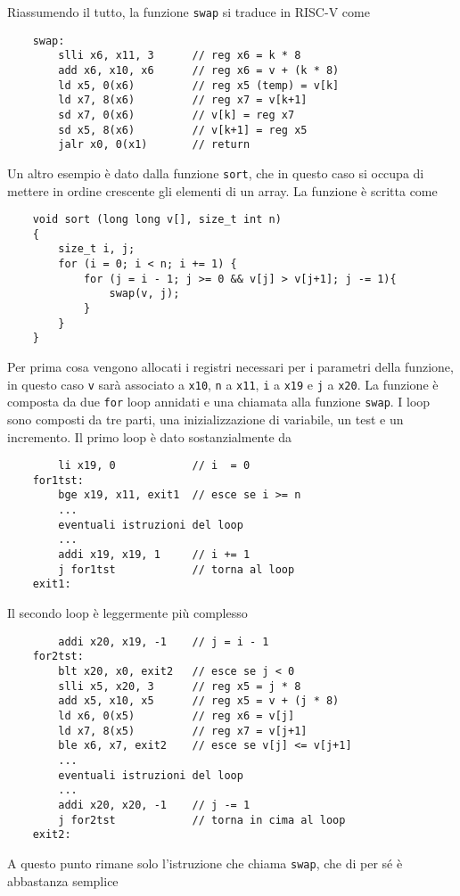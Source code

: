 \documentclass[a4paper,12pt]{article}
\theoremstyle{break}
\newcommand{\code}[1]{\texttt{#1}}
\numberwithin{equation}{section}
\begin{document}
Riassumendo il tutto, la funzione \code{swap} si traduce in RISC-V come

\begin{verbatim}
    swap:
        slli x6, x11, 3      // reg x6 = k * 8
        add x6, x10, x6      // reg x6 = v + (k * 8)
        ld x5, 0(x6)         // reg x5 (temp) = v[k]
        ld x7, 8(x6)         // reg x7 = v[k+1]
        sd x7, 0(x6)         // v[k] = reg x7
        sd x5, 8(x6)         // v[k+1] = reg x5
        jalr x0, 0(x1)       // return
\end{verbatim}
Un altro esempio è dato dalla funzione \code{sort}, che in questo caso si occupa di mettere in ordine crescente gli elementi di un array. La funzione è scritta come
\begin{verbatim}
    void sort (long long v[], size_t int n)
    {
        size_t i, j;
        for (i = 0; i < n; i += 1) {
            for (j = i - 1; j >= 0 && v[j] > v[j+1]; j -= 1){
                swap(v, j);
            }
        }
    }
\end{verbatim}
Per prima cosa vengono allocati i registri necessari per i parametri della funzione, in questo caso \code{v} sarà associato a \code{x10}, \code{n} a \code{x11}, \code{i} a \code{x19} e \code{j} a \code{x20}.  
La funzione è composta da due \code{for} loop annidati e una chiamata alla funzione \code{swap}. I loop sono composti da tre parti, una inizializzazione di variabile, un test e un incremento.  
Il primo loop è dato sostanzialmente da 
\begin{verbatim}
        li x19, 0            // i  = 0
    for1tst:
        bge x19, x11, exit1  // esce se i >= n
        ...
        eventuali istruzioni del loop
        ... 
        addi x19, x19, 1     // i += 1
        j for1tst            // torna al loop
    exit1:
\end{verbatim}
Il secondo loop è leggermente più complesso 
\begin{verbatim}
        addi x20, x19, -1    // j = i - 1
    for2tst:
        blt x20, x0, exit2   // esce se j < 0
        slli x5, x20, 3      // reg x5 = j * 8
        add x5, x10, x5      // reg x5 = v + (j * 8)
        ld x6, 0(x5)         // reg x6 = v[j]
        ld x7, 8(x5)         // reg x7 = v[j+1]
        ble x6, x7, exit2    // esce se v[j] <= v[j+1]
        ... 
        eventuali istruzioni del loop
        ... 
        addi x20, x20, -1    // j -= 1
        j for2tst            // torna in cima al loop
    exit2:
\end{verbatim}
A questo punto rimane solo l'istruzione che chiama \code{swap}, che di per sé è abbastanza semplice
\end{document}
